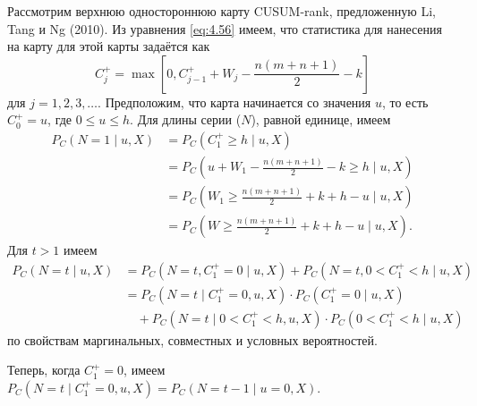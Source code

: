 Рассмотрим верхнюю одностороннюю карту CUSUM-rank, предложенную Li, Tang и Ng (2010). Из уравнения \eqref{eq:4.56} имеем, что статистика для нанесения на карту для этой карты задаётся как
\[
	C_j^+ = \max\left[ 0, C_{j-1}^+ + W_j - \frac{n(m + n + 1)}{2} - k \right]
\]
для \(j = 1, 2, 3, \ldots\). Предположим, что карта начинается со значения \(u\), то есть \(C_0^+ = u\), где \(0 \le u \le h\). Для длины серии (\(N\)), равной единице, имеем
\begin{align*}
	P_C\left( N = 1 \mid u, X \right)
	&= P_C\left( C_1^+ \ge h \mid u, X \right) \\
	&= P_C\left( u + W_1 - \frac{n(m + n + 1)}{2} - k \ge h \mid u, X \right) \\
	&= P_C\left( W_1 \ge \frac{n(m + n + 1)}{2} + k + h - u \mid u, X \right) \\
	&= P_C\left( W \ge \frac{n(m + n + 1)}{2} + k + h - u \mid u, X \right).
\end{align*}
Для \(t > 1\) имеем
\begin{align*}
	P_C\left( N = t \mid u, X \right)
	&= P_C\left( N = t, C_1^+ = 0 \mid u, X \right) + P_C\left( N = t, 0 < C_1^+ < h \mid u, X \right) \\
	&= P_C\left( N = t \mid C_1^+ = 0, u, X \right)\cdot P_C\left( C_1^+ = 0 \mid u, X \right) \\
	&\quad + P_C\left( N = t \mid 0 < C_1^+ < h, u, X \right)\cdot P_C\left( 0 < C_1^+ < h \mid u, X \right)
\end{align*}
по свойствам маргинальных, совместных и условных вероятностей.

Теперь, когда \(C_1^+ = 0\), имеем \(P_C\left( N = t \mid C_1^+ = 0, u, X \right) = P_C\left( N = t - 1 \mid u = 0, X \right)\).

